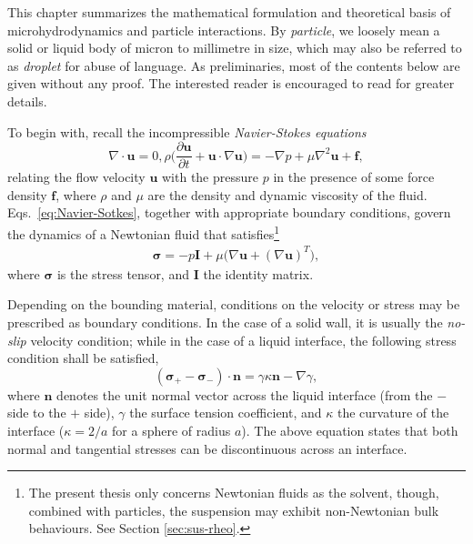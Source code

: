 This chapter summarizes the mathematical formulation and theoretical basis of microhydrodynamics and particle interactions.
By \emph{particle}, we loosely mean a solid or liquid body of micron to millimetre in size, which may also be referred to as \emph{droplet} for abuse of language.
As preliminaries, most of the contents below are given without any proof. The interested reader is encouraged to read \cite{Batchelor, hb, ps, kim_karrila, graham_2018} for greater details.

\bigskip

To begin with, recall the incompressible \emph{Navier-Stokes equations}
\begin{subequations} \label{eq:Navier-Sotkes}
 \begin{equation}
   \nabla \cdot {\bm u} = 0,
  \label{eq:div-free}
 \end{equation}
 \begin{equation}
   \rho \bigg(\frac{\partial {\bm u}}{\partial t} + {\bm u} \cdot \nabla {\bm u} \bigg) = -\nabla p + \mu \nabla ^2  {\bm u} + {\bm f},
  \label{eq:NS}
 \end{equation}
\end{subequations}
relating the flow velocity $\bm u$ with the pressure $p$ in the presence of some force density $\bm f$, where $\rho$ and $\mu$ are the density and dynamic viscosity of the fluid.
Eqs.\ \eqref{eq:Navier-Sotkes}, together with appropriate boundary conditions, govern the dynamics of a Newtonian fluid that satisfies\footnote{The present thesis only concerns Newtonian fluids as the solvent, though, combined with particles, the suspension may exhibit non-Newtonian bulk behaviours. See Section \ref{sec:sus-rheo}.}
\begin{equation}
 \begin{aligned}
   {\bm \sigma} = -p {\bm I}+ \mu \bigg( \nabla {\bm u} + (\nabla {\bm u})^T \bigg),
 \end{aligned}
\end{equation}
where $\bm \sigma$ is the stress tensor, and $\bm I$ the identity matrix.

Depending on the bounding material, conditions on the velocity or stress may be prescribed as boundary conditions. In the case of a solid wall, it is usually the \emph{no-slip} velocity condition; while in the case of a liquid interface, the following stress condition shall be satisfied,
\begin{equation} \label{eq:stress-bc}
  ({\bm \sigma}_+ - {\bm \sigma}_- ) \cdot {\bm n} = \gamma \kappa {\bm n} - \nabla \gamma,
\end{equation}
where $\bm n$ denotes the unit normal vector across the liquid interface (from the $-$ side to the $+$ side), $\gamma$ the surface tension coefficient, and $\kappa$ the curvature of the interface (\eg $\kappa=2/a$ for a sphere of radius $a$).
The above equation states that both normal and tangential stresses can be discontinuous across an interface.

